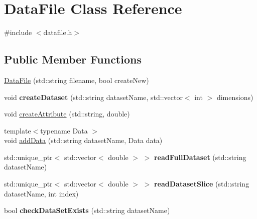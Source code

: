 \hypertarget{classDataFile}{}\section{Data\+File Class Reference}
\label{classDataFile}


{\ttfamily \#include $<$datafile.\+h$>$}

\subsection*{Public Member Functions}
\begin{DoxyCompactItemize}
\item 
\hyperlink{classDataFile_a506afaa3e498c06d841cfd2166724add}{Data\+File} (std\+::string filename, bool create\+New)
\item 
\mbox{\label{classDataFile_a85ee9b657be8e2e0bb69301352712c05}} 
void {\bfseries create\+Dataset} (std\+::string dataset\+Name, std\+::vector$<$ int $>$ dimensions)
\item 
void \hyperlink{classDataFile_a6da2338acc382d3538d53f5747e46b21}{create\+Attribute} (std\+::string, double)
\item 
{\footnotesize template$<$typename Data $>$ }\\void \hyperlink{classDataFile_a51739c09c99007a2cd3faa960efd45ed}{add\+Data} (std\+::string dataset\+Name, Data data)
\item 
\mbox{\label{classDataFile_a07469209523bf5bb9b4997588f7fc822}} 
std\+::unique\+\_\+ptr$<$ std\+::vector$<$ double $>$ $>$ {\bfseries read\+Full\+Dataset} (std\+::string dataset\+Name)
\item 
\mbox{\label{classDataFile_a39c29339dc09376f18e5bdd3554f71ca}} 
std\+::unique\+\_\+ptr$<$ std\+::vector$<$ double $>$ $>$ {\bfseries read\+Dataset\+Slice} (std\+::string dataset\+Name, int index)
\item 
\mbox{\label{classDataFile_a775c1da3cdfc1cb6d986fe2e40c0a495}} 
bool {\bfseries check\+Data\+Set\+Exists} (std\+::string dataset\+Name)
\end{DoxyCompactItemize}
